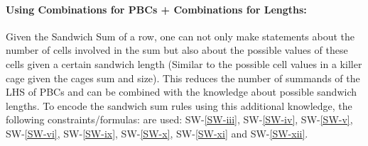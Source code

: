 \paragraph{Using Combinations for PBCs + Combinations for Lengths:} Given the Sandwich Sum of a row, one can not only make statements about the number of cells involved in the sum but also about the possible values of these cells given a certain sandwich length (Similar to the possible cell values in a killer cage given the cages sum and size). This reduces the number of summands of the LHS of PBCs and can be combined with the knowledge about possible sandwich lengths. To encode the sandwich sum rules using this additional knowledge, the following constraints/formulas: are used: SW-\ref{SW-iii}, SW-\ref{SW-iv}, SW-\ref{SW-v}, SW-\ref{SW-vi}, SW-\ref{SW-ix}, SW-\ref{SW-x}, SW-\ref{SW-xi} and SW-\ref{SW-xii}.

